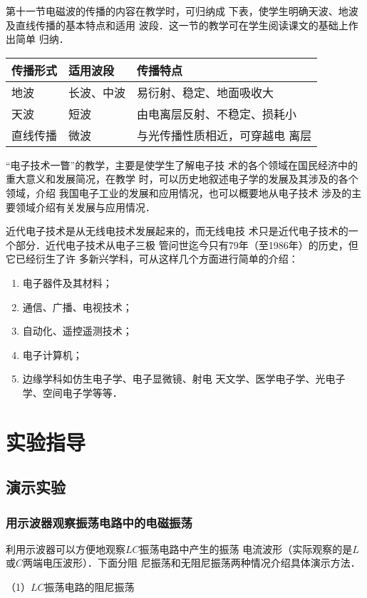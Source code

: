 第十一节电磁波的传播的内容在教学时，可归纳成
下表，使学生明确天波、地波及直线传播的基本特点和适用
波段．这一节的教学可在学生阅读课文的基础上作出简单
归纳．
\begin{center}
\begin{tabular}{lll}
\hline
传播形式&适用波段&传播特点\\
\hline
地波&长波、中波&易衍射、稳定、地面吸收大\\
天波&短波&由电离层反射、不稳定、损耗小\\
直线传播&微波&与光传播性质相近，可穿越电
离层\\
\hline
\end{tabular}
\end{center}

“电子技术一瞥”的教学，主要是使学生了解电子技
术的各个领域在国民经济中的重大意义和发展简况，在教学
时，可以历史地叙述电子学的发展及其涉及的各个领域，介绍
我国电子工业的发展和应用情况，也可以概要地从电子技术
涉及的主要领域介绍有关发展与应用情况．

近代电子技术是从无线电技术发展起来的，而无线电技
术只是近代电子技术的一个部分．近代电子技术从电子三极
管问世迄今只有79年（至1986年）的历史，但它已经衍生了许
多新兴学科，可从这样几个方面进行简单的介绍：
\begin{enumerate}
\item 电子器件及其材料；
\item 通信、广播、电视技术；
\item 自动化、遥控遥测技术；
\item 电子计算机；
\item 边缘学科如仿生电子学、电子显微镜、射电
天文学、医学电子学、光电子学、空间电子学等等．
\end{enumerate}

\section{实验指导}
\subsection{演示实验}
\subsubsection{用示波器观察振荡电路中的电磁振荡}
利用示波器可以方便地观察$LC$振荡电路中产生的振荡
电流波形（实际观察的是$L$或$C$两端电压波形）．下面分阻
尼振荡和无阻尼振荡两种情况介绍具体演示方法．

（1）$LC$振荡电路的阻尼振荡

